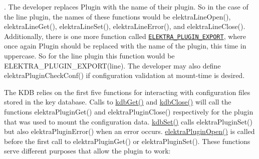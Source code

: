. The developer replaces {\ttfamily Plugin} with the name of their plugin. So in the case of the line plugin, the names of these functions would be {\ttfamily elektra\+Line\+Open()}, {\ttfamily elektra\+Line\+Get()}, {\ttfamily elektra\+Line\+Set()}, {\ttfamily elektra\+Line\+Error()}, and {\ttfamily elektra\+Line\+Close()}. Additionally, there is one more function called \href{https://doc.libelektra.org/api/current/html/group__plugin.html#ga8dd092048e972a3f0c9c9f54eb41576e}{\tt E\+L\+E\+K\+T\+R\+A\+\_\+\+P\+L\+U\+G\+I\+N\+\_\+\+E\+X\+P\+O\+RT}, where once again {\ttfamily Plugin} should be replaced with the name of the plugin, this time in uppercase. So for the line plugin this function would be {\ttfamily E\+L\+E\+K\+T\+R\+A\+\_\+\+P\+L\+U\+G\+I\+N\+\_\+\+E\+X\+P\+O\+R\+T(line)}. The developer may also define {\ttfamily elektra\+Plugin\+Check\+Conf()} if configuration validation at mount-\/time is desired.

The K\+DB relies on the first five functions for interacting with configuration files stored in the key database. Calls to {\ttfamily \hyperlink{group__kdb_ga28e385fd9cb7ccfe0b2f1ed2f62453a1}{kdb\+Get()}} and {\ttfamily \hyperlink{group__kdb_gadb54dc9fda17ee07deb9444df745c96f}{kdb\+Close()}} will call the functions {\ttfamily elektra\+Plugin\+Get()} and {\ttfamily elektra\+Plugin\+Close()} respectively for the plugin that was used to mount the configuration data. {\ttfamily \hyperlink{group__kdb_ga11436b058408f83d303ca5e996832bcf}{kdb\+Set()}} calls {\ttfamily elektra\+Plugin\+Set()} but also {\ttfamily elektra\+Plugin\+Error()} when an error occurs. {\ttfamily \hyperlink{elektra_2plugin_8c_a32a70a7876542c51d153164ac5108a57}{elektra\+Plugin\+Open()}} is called before the first call to {\ttfamily elektra\+Plugin\+Get()} or {\ttfamily elektra\+Plugin\+Set()}. These functions serve different purposes that allow the plugin to work\+:


